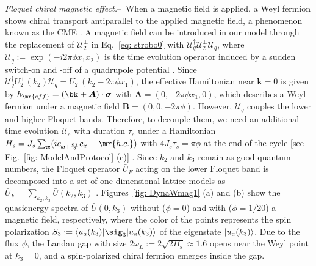\documentclass[
floatfix,
pra,
twocolumn,
reprint,
amsmath,amssymb,
aps,
footnote,
]{revtex4}
\begin{document}
\textit{Floquet chiral magnetic effect.}--\
When a magnetic field is applied, a Weyl fermion shows chiral transport antiparallel to the applied magnetic field, a phenomenon known as the CME \cite{Fukushima08}.
A magnetic field can be introduced in our model through the replacement of
$\mathcal{U}_2^\pm$ in Eq.~\eqref{eq: strobo0} with $\mathcal{U}_q^\dagger \mathcal{U}_2^\pm \mathcal{U}_q$, where $\mathcal{U}_q := \exp(- i 2 \pi \phi x_1 x_2)$ is the time evolution operator induced by a sudden switch-on and -off of a quadrupole potential \cite{Sorensen05, HafeziM07}.
Since $\mathcal{U}_q^\dagger U_2^\pm(k_2) \mathcal{U}_q = U_2^\pm(k_2 - 2 \pi \phi x_1)$, the effective Hamiltonian near $\bm{k} = 0$ is given by $h_{\mr{eff}} = (\bk + \bm{A})\cdot \bm{\sigma}$ with $\bm{A} = (0, -2 \pi \phi x_1, 0)$, which describes a Weyl fermion under a magnetic field $\bm{B} = (0,0, -2 \pi \phi)$.
However, $\mathcal{U}_q$ couples the lower and higher Floquet bands.
Therefore, to decouple them, we need an additional time evolution $\mathcal{U}_s$ with duration $\tau_s$ under a Hamiltonian $H_s = J_s \sum_{\bm{x}} (i c_{\bm{x} + {\bm{e}_3 \over 2}}c_{\bm{x}} + \mr{h.c.})$ with $4J_s\tau_s = \pi\phi$ at the end of the cycle [see Fig.~\ref{fig: ModelAndProtocol} (c)] \cite{experiment}.
Since $k_2$ and $k_3$ remain as good quantum numbers, the Floquet operator $\bar{U}_F$ acting on the lower Floquet band is decomposed into a set of one-dimensional lattice models as $\bar{U}_F = \sum_{k_2, k_3} \bar{U}(k_2, k_3)$ \cite{barU_form}.
Figures~\ref{fig: DynaWmag1} (a) and (b) show the quasienergy spectra of $\bar{U}(0, k_3)$ without ($\phi = 0$) and with ($\phi = 1/20$) a magnetic field, respectively, where the color of the points represents the spin polarization $S_3 := \braket{u_a(k_3) | \sig_3 | u_a(k_3)}$ of the eigenstate $\ket{u_a(k_3)}$.
Due to the flux $\phi$, the Landau gap with size $2 \omega_L := 2\sqrt{2B_s} \approx 1.6$ opens near the Weyl point at $k_3 = 0$, and a spin-polarized chiral fermion emerges inside the gap.
\end{document}
